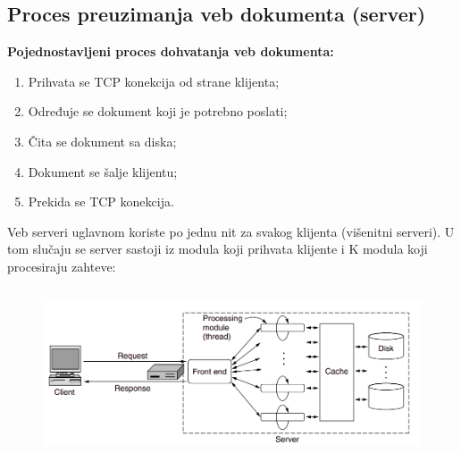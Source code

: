 \documentclass[a4paper]{article}
\begin{document}
    \subsection{Proces preuzimanja veb dokumenta (server)}
        \noindent \textbf{Pojednostavljeni proces dohvatanja veb dokumenta:}
        \begin{enumerate}
            \item Prihvata se TCP konekcija od strane klijenta;
            \item Određuje se dokument koji je potrebno poslati;
            \item Čita se dokument sa diska;
            \item Dokument se šalje klijentu;
            \item Prekida se TCP konekcija.
        \end{enumerate}
        Veb serveri uglavnom koriste po jednu nit za svakog klijenta (višenitni serveri). U tom 
        slučaju se server sastoji iz modula koji prihvata klijente i K modula koji procesiraju
        zahteve:
        \begin{figure}[H]
            \begin{center}
                \includegraphics[width=120mm,height=50mm]{Slike/http3.png}
            \end{center}
        \end{figure}
\end{document}
